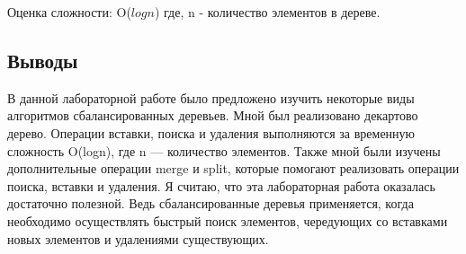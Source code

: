 \documentclass[12pt]{article}
\begin{document}

Оценка сложности: O($logn$) где, n - количество элементов в дереве.

\subsection*{Выводы}

В данной лабораторной работе было предложено изучить некоторые виды алгоритмов
сбалансированных деревьев. Мной был реализовано декартово дерево. Операции
вставки, поиска и удаления выполняются за временную сложность O(logn), где n —
количество элементов. Также мной были изучены дополнительные операции merge и
split, которые помогают реализовать операции поиска, вставки и удаления.
Я считаю, что эта лабораторная работа оказалась достаточно полезной. Ведь
сбалансированные деревья применяется, когда необходимо осуществлять быстрый поиск
элементов, чередующих со вставками новых элементов и удалениями существующих.
\end{document}
